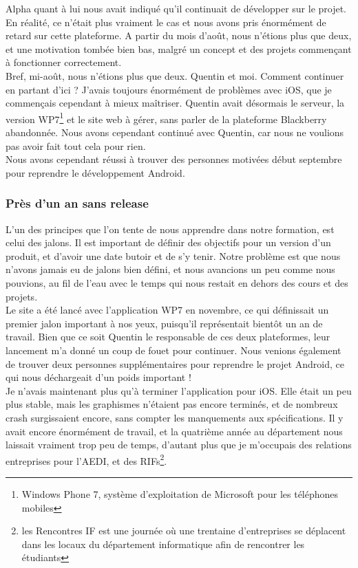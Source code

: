 \documentclass{article}
\begin{document}
		Alpha quant  à lui nous avait indiqué qu'il continuait de développer sur le projet. En réalité, ce n'était plus vraiment le cas et nous avons pris énormément de retard sur cette plateforme. A partir du mois d'août, nous n'étions plus que deux, et une motivation tombée bien bas, malgré un concept et des projets commençant à fonctionner correctement. \\
	
		Bref, mi-août, nous n'étions plus que deux. Quentin et moi. Comment continuer en partant d'ici ? J'avais toujours énormément de problèmes avec iOS, que je commençais cependant à mieux maîtriser. Quentin avait désormais le serveur, la version WP7\footnote{Windows Phone 7, système d'exploitation de Microsoft pour les téléphones mobiles} et le site web à gérer, sans parler de la plateforme Blackberry abandonnée. Nous avons cependant continué avec Quentin, car nous ne voulions pas avoir fait tout cela pour rien.\\
		
		Nous avons cependant réussi à trouver des personnes motivées début septembre pour reprendre le développement Android. 

		\subsubsection{Près d'un an sans release}
		L'un des principes que l'on tente de nous apprendre dans notre formation, est celui des jalons. Il est important de définir des objectifs pour un version d'un produit, et d'avoir une date butoir et de s'y tenir. Notre problème est que nous n'avons jamais eu de jalons bien défini, et nous avancions un peu comme nous pouvions, au fil de l'eau avec le temps qui nous restait en dehors des cours et des projets.  \\
		
		Le site a été lancé avec l'application WP7 en novembre, ce qui définissait un premier jalon important à nos yeux, puisqu'il représentait bientôt un an de travail. Bien que ce soit Quentin le responsable de ces deux plateformes, leur lancement m'a donné un coup de fouet pour continuer. Nous venions également de trouver deux personnes supplémentaires pour reprendre le projet Android, ce qui nous déchargeait d'un poids important !\\
		
		Je n'avais maintenant plus qu'à terminer l'application pour iOS. Elle était un peu plus stable, mais les graphismes n'étaient pas encore terminés, et de nombreux crash surgissaient encore, sans compter les manquements aux spécifications. Il y avait encore énormément de travail, et la quatrième année au département nous laissait vraiment trop peu de temps, d'autant plus que je m'occupais des relations entreprises pour l'AEDI, et des RIFs\footnote{les Rencontres IF est une journée où une trentaine d'entreprises se déplacent dans les locaux du département informatique afin de rencontrer les étudiants}. \\
		
\end{document}
